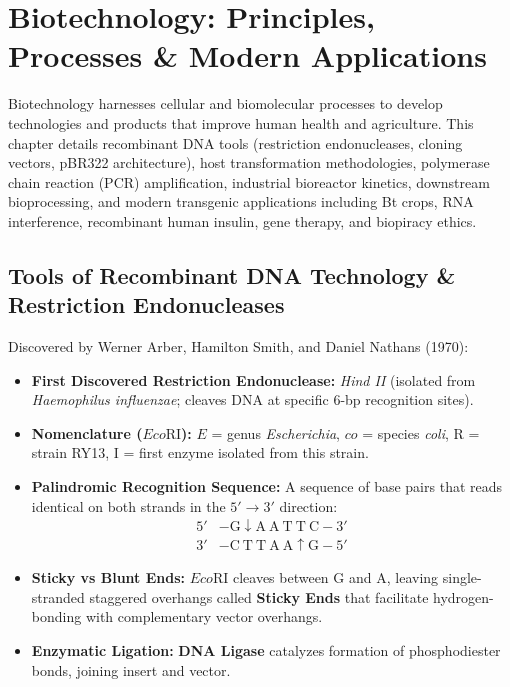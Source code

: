 \documentclass[10pt,twoside,openright]{book}
\begin{document}
\chapter{Biotechnology: Principles, Processes \& Modern Applications}

Biotechnology harnesses cellular and biomolecular processes to develop technologies and products that improve human health and agriculture. This chapter details recombinant DNA tools (restriction endonucleases, cloning vectors, pBR322 architecture), host transformation methodologies, polymerase chain reaction (PCR) amplification, industrial bioreactor kinetics, downstream bioprocessing, and modern transgenic applications including Bt crops, RNA interference, recombinant human insulin, gene therapy, and biopiracy ethics.

\section{Tools of Recombinant DNA Technology \& Restriction Endonucleases}

\begin{conceptbox}
Discovered by Werner Arber, Hamilton Smith, and Daniel Nathans (1970):
\begin{itemize}[leftmargin=*]
  \item \textbf{First Discovered Restriction Endonuclease:} \textit{Hind II} (isolated from \textit{Haemophilus influenzae}; cleaves DNA at specific 6-bp recognition sites).
  \item \textbf{Nomenclature ($Eco\mathrm{RI}$):} $E$ = genus \textit{Escherichia}, $co$ = species \textit{coli}, $\mathrm{R}$ = strain RY13, $\mathrm{I}$ = first enzyme isolated from this strain.
  \item \textbf{Palindromic Recognition Sequence:} A sequence of base pairs that reads identical on both strands in the $5'\to 3'$ direction:
  \begin{equation*}
    \begin{aligned}
      5' &-\mathrm{G \downarrow A \ A \ T \ T \ C}-3' \\
      3' &-\mathrm{C \ T \ T \ A \ A \uparrow G}-5'
    \end{aligned}
  \end{equation*}
  \item \textbf{Sticky vs Blunt Ends:} $Eco\mathrm{RI}$ cleaves between $\mathrm{G}$ and $\mathrm{A}$, leaving single-stranded staggered overhangs called \textbf{Sticky Ends} that facilitate hydrogen-bonding with complementary vector overhangs.
  \item \textbf{Enzymatic Ligation:} \textbf{DNA Ligase} catalyzes formation of phosphodiester bonds, joining insert and vector.
\end{itemize}
\end{conceptbox}
\end{document}
